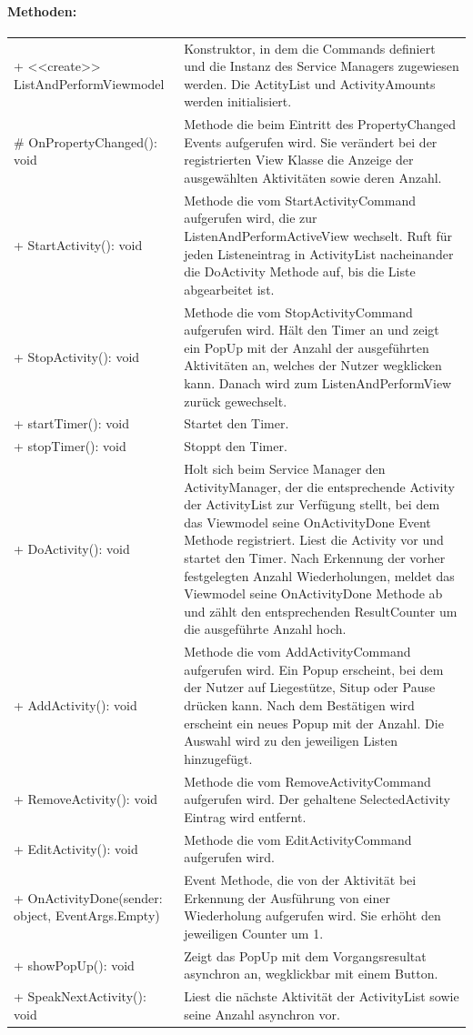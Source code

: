 \documentclass[a4paper,12pt]{article}
\begin{document}
\paragraph{Methoden:}
\begin{tabular}{p{7cm}p{10cm}}
+ <<create>> ListAndPerformViewmodel & Konstruktor, in dem die Commands definiert und die Instanz des Service Managers zugewiesen werden. Die ActityList und ActivityAmounts werden initialisiert.\\
\# OnPropertyChanged(): void & Methode die beim Eintritt des PropertyChanged Events aufgerufen wird. Sie verändert bei der registrierten View Klasse die Anzeige der ausgewählten Aktivitäten sowie deren Anzahl. \\
+ StartActivity(): void & Methode die vom StartActivityCommand aufgerufen wird, die zur ListenAndPerformActiveView wechselt. Ruft für jeden Listeneintrag in ActivityList nacheinander die DoActivity Methode auf, bis die Liste abgearbeitet ist. \\
+ StopActivity(): void & Methode die vom StopActivityCommand aufgerufen wird. Hält den Timer an und zeigt ein PopUp mit der Anzahl der ausgeführten Aktivitäten an, welches der Nutzer wegklicken kann. Danach wird zum ListenAndPerformView zurück gewechselt. \\
+ startTimer(): void & Startet den Timer. \\
+ stopTimer(): void & Stoppt den Timer. \\
+ DoActivity(): void &  Holt sich  beim Service Manager den ActivityManager, der die entsprechende Activity der ActivityList zur Verfügung stellt, bei dem das Viewmodel seine OnActivityDone Event Methode registriert. Liest die Activity vor und startet den Timer. Nach Erkennung der vorher festgelegten Anzahl Wiederholungen, meldet das Viewmodel seine OnActivityDone Methode ab und zählt den entsprechenden ResultCounter um die ausgeführte Anzahl hoch. \\
+ AddActivity(): void &  Methode die vom AddActivityCommand aufgerufen wird. Ein Popup erscheint, bei dem der Nutzer auf Liegestütze, Situp oder Pause drücken kann. Nach dem Bestätigen wird erscheint ein neues Popup mit der Anzahl. Die Auswahl wird zu den jeweiligen Listen hinzugefügt. \\
+ RemoveActivity(): void &  Methode die vom RemoveActivityCommand aufgerufen wird. Der gehaltene SelectedActivity Eintrag wird entfernt. \\
+ EditActivity(): void & Methode die vom EditActivityCommand aufgerufen wird. \\
+ OnActivityDone(sender: object, EventArgs.Empty) & Event Methode, die von der Aktivität bei Erkennung der Ausführung von einer Wiederholung aufgerufen wird. Sie erhöht den jeweiligen Counter um 1.  \\
+ showPopUp(): void & Zeigt das PopUp mit dem Vorgangsresultat asynchron an, wegklickbar mit einem Button. \\
+ SpeakNextActivity(): void & Liest die nächste Aktivität der ActivityList sowie seine Anzahl asynchron vor. \\
\end{tabular}
\end{document}
